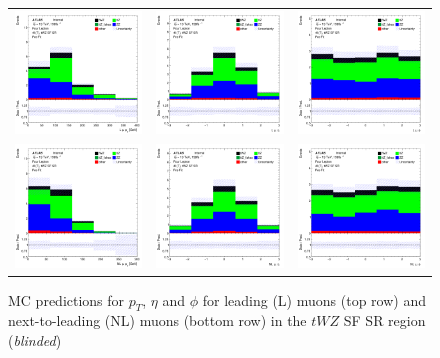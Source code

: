 \begin{figure}[htbp]
    \centering
  \begin{tabular}{ccc}


    \includegraphics[width=.2\textwidth]{figures/PreFitPlots/lep4_tWZ_4T_SF_L_mu_pt} &
    \includegraphics[width=.2\textwidth]{figures/PreFitPlots/lep4_tWZ_4T_SF_L_mu_eta} &
    \includegraphics[width=.2\textwidth]{figures/PreFitPlots/lep4_tWZ_4T_SF_L_mu_phi} \\
    \includegraphics[width=.2\textwidth]{figures/PreFitPlots/lep4_tWZ_4T_SF_NL_mu_pt} &
    \includegraphics[width=.2\textwidth]{figures/PreFitPlots/lep4_tWZ_4T_SF_NL_mu_eta} &
    \includegraphics[width=.2\textwidth]{figures/PreFitPlots/lep4_tWZ_4T_SF_NL_mu_phi} \\

  \end{tabular}
    \caption{MC predictions for $p_{T}$, $\eta$ and $\phi$ for leading (L) muons (top row) and next-to-leading (NL) muons (bottom row) in the $tWZ$ SF SR region (\textit{blinded})}
\end{figure}
\clearpage

